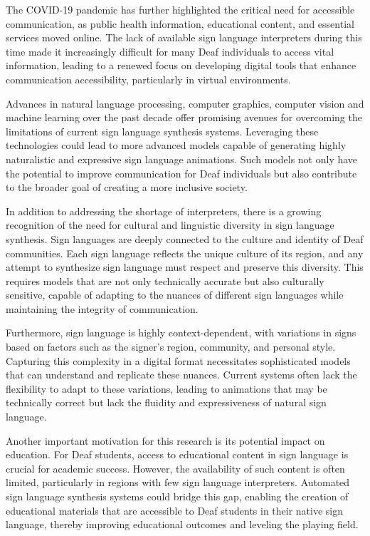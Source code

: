 \documentclass[../../main.tex]{subfiles}
\begin{document}
The COVID-19 pandemic has further highlighted the critical need for accessible communication, as public health information, educational content, and essential services moved online. The lack of available sign language interpreters during this time made it increasingly difficult for many Deaf individuals to access vital information, leading to a renewed focus on developing digital tools that enhance communication accessibility, particularly in virtual environments.

Advances in natural language processing, computer graphics, computer vision and machine learning  over the past decade offer promising avenues for overcoming the limitations of current sign language synthesis systems. Leveraging these technologies could lead to more advanced models capable of generating highly naturalistic and expressive sign language animations. Such models not only have the potential to improve communication for Deaf individuals but also contribute to the broader goal of creating a more inclusive society.

In addition to addressing the shortage of interpreters, there is a growing recognition of the need for cultural and linguistic diversity in sign language synthesis. Sign languages are deeply connected to the culture and identity of Deaf communities. Each sign language reflects the unique culture of its region, and any attempt to synthesize sign language must respect and preserve this diversity. This requires models that are not only technically accurate but also culturally sensitive, capable of adapting to the nuances of different sign languages while maintaining the integrity of communication.

Furthermore, sign language is highly context-dependent, with variations in signs based on factors such as the signer’s region, community, and personal style. Capturing this complexity in a digital format necessitates sophisticated models that can understand and replicate these nuances. Current systems often lack the flexibility to adapt to these variations, leading to animations that may be technically correct but lack the fluidity and expressiveness of natural sign language.

Another important motivation for this research is its potential impact on education. For Deaf students, access to educational content in sign language is crucial for academic success. However, the availability of such content is often limited, particularly in regions with few sign language interpreters. Automated sign language synthesis systems could bridge this gap, enabling the creation of educational materials that are accessible to Deaf students in their native sign language, thereby improving educational outcomes and leveling the playing field.
\end{document}
